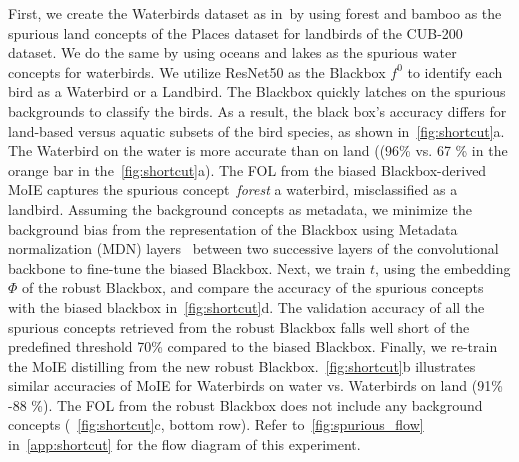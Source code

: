 First, we create the Waterbirds dataset as in~\cite{sagawa2019dro}by using forest and bamboo as the spurious land concepts of the Places dataset for landbirds of the CUB-200 dataset. We do the same by using oceans and lakes as the spurious water concepts for waterbirds. We utilize ResNet50 as the Blackbox $f^0$ to identify each bird as a Waterbird or a Landbird. The Blackbox quickly latches on the spurious backgrounds to classify the birds. As a result, the black box's accuracy differs for land-based versus aquatic subsets of the bird species, as shown in~\cref{fig:shortcut}a. The Waterbird on the water is more accurate than on land ((96\%  vs. 67 \% in the orange bar in the~\cref{fig:shortcut}a). The FOL from the biased Blackbox-derived MoIE captures the spurious concept \textit{forest} a waterbird, misclassified as a landbird. Assuming the background concepts as metadata, we minimize the background bias from the representation of the Blackbox using Metadata normalization (MDN) layers~\cite{lu2021metadata} between two successive layers of the convolutional backbone to fine-tune the biased Blackbox. Next, we train $t$, using the embedding $\Phi$ of the robust Blackbox, and compare the accuracy of the spurious concepts with the biased blackbox in~\cref{fig:shortcut}d. The validation accuracy of all the spurious concepts retrieved from the robust Blackbox falls well short of the predefined threshold 70\% compared to the biased Blackbox. Finally, we re-train the MoIE distilling from the new robust Blackbox.~\cref{fig:shortcut}b illustrates similar accuracies of MoIE for Waterbirds on water vs. Waterbirds on land (91\% -88 \%). The FOL from the robust Blackbox does not include any background concepts (~\ref{fig:shortcut}c, bottom row). Refer to~\ref{fig:spurious_flow} in~\cref{app:shortcut} for the flow diagram of this experiment.